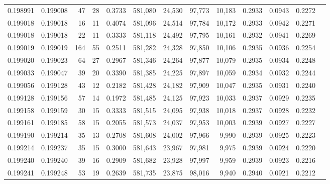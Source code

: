 \begin{tabular}{rrrrrrrrrrrrr}
0.198991 & 0.199008 &    47 &  28 &                                     0.3733 & 581,080 &  24,530 &  97,773 &  10,183 & 0.2933 & 0.0943 & 0.2272 \\
0.199018 & 0.199018 &    16 &  11 &                                     0.4074 & 581,096 &  24,514 &  97,784 &  10,172 & 0.2933 & 0.0942 & 0.2271 \\
0.199018 & 0.199018 &    22 &  11 &                                     0.3333 & 581,118 &  24,492 &  97,795 &  10,161 & 0.2932 & 0.0941 & 0.2269 \\
0.199019 & 0.199019 &   164 &  55 &                                     0.2511 & 581,282 &  24,328 &  97,850 &  10,106 & 0.2935 & 0.0936 & 0.2254 \\
0.199020 & 0.199023 &    64 &  27 &                                     0.2967 & 581,346 &  24,264 &  97,877 &  10,079 & 0.2935 & 0.0934 & 0.2248 \\
0.199033 & 0.199047 &    39 &  20 &                                     0.3390 & 581,385 &  24,225 &  97,897 &  10,059 & 0.2934 & 0.0932 & 0.2244 \\
0.199056 & 0.199128 &    43 &  12 &                                     0.2182 & 581,428 &  24,182 &  97,909 &  10,047 & 0.2935 & 0.0931 & 0.2240 \\
0.199128 & 0.199156 &    57 &  14 &                                     0.1972 & 581,485 &  24,125 &  97,923 &  10,033 & 0.2937 & 0.0929 & 0.2235 \\
0.199158 & 0.199159 &    30 &  15 &                                     0.3333 & 581,515 &  24,095 &  97,938 &  10,018 & 0.2937 & 0.0928 & 0.2232 \\
0.199161 & 0.199185 &    58 &  15 &                                     0.2055 & 581,573 &  24,037 &  97,953 &  10,003 & 0.2939 & 0.0927 & 0.2227 \\
0.199190 & 0.199214 &    35 &  13 &                                     0.2708 & 581,608 &  24,002 &  97,966 &   9,990 & 0.2939 & 0.0925 & 0.2223 \\
0.199214 & 0.199237 &    35 &  15 &                                     0.3000 & 581,643 &  23,967 &  97,981 &   9,975 & 0.2939 & 0.0924 & 0.2220 \\
0.199240 & 0.199240 &    39 &  16 &                                     0.2909 & 581,682 &  23,928 &  97,997 &   9,959 & 0.2939 & 0.0923 & 0.2216 \\
0.199241 & 0.199248 &    53 &  19 &                                     0.2639 & 581,735 &  23,875 &  98,016 &   9,940 & 0.2940 & 0.0921 & 0.2212 \\

\end{tabular}
